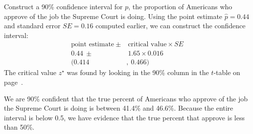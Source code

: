 \begin{example}{Construct a 90\% confidence interval for $p$, the proportion of Americans who approve of the job the Supreme Court is doing.}\label{90CIForJobSupremeCourtDoingExample}
Using the point estimate $\hat{p} = 0.44$ and standard error $SE = 0.16$ computed earlier, we can construct the confidence interval:
\begin{align*}
\text{point estimate}\ \pm&\  \text{critical value} \times SE \\
0.44\ \pm&\  1.65 \times 0.016 \\
(0.414&,\ 0.466)
\end{align*}
The critical value $z^{\star}$ was found by looking in the 90\% column in the $t$-table on page~\pageref{tDistributionTable}.

We are 90\% confident that the true percent of Americans who approve of the job the Supreme Court is doing is between 41.4\% and 46.6\%. Because the entire interval is below 0.5, we have evidence that the true percent that approve is less than 50\%.
\end{example}


\textA{\newpage}


